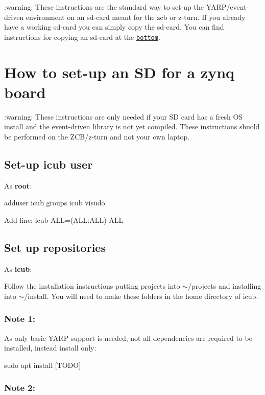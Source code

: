\+:warning\+: These instructions are the standard way to set-\/up the Y\+A\+R\+P/event-\/driven environment on an sd-\/card meant for the zcb or z-\/turn. If you already have a working sd-\/card you can simply copy the sd-\/card. You can find instructions for copying an sd-\/card at the \href{#how-copy-an-entire-sd-card-for-a-new-board}{\tt bottom}.

\section*{How to set-\/up an SD for a zynq board}

\+:warning\+: These instructions are only needed if your SD card has a fresh OS install and the {\ttfamily event-\/driven} library is not yet compiled. These instructions shuold be performed on the Z\+C\+B/z-\/turn and not your own laptop.

\subsection*{Set-\/up icub user}

As {\bfseries root}\+: 
\begin{DoxyCode}
adduser icub
groups icub
visudo
\end{DoxyCode}
 Add line\+: {\ttfamily icub A\+LL=(A\+LL\+:A\+LL) A\+LL}

\subsection*{Set up repositories}

As {\bfseries icub}\+:
\begin{DoxyItemize}
\item Follow the installation instructions putting projects into {\ttfamily $\sim$/projects} and installing into {\ttfamily $\sim$/install}. You will need to make these folders in the home directory of icub.
\end{DoxyItemize}

\subsubsection*{Note 1\+:}

As only basic {\ttfamily Y\+A\+RP} support is needed, not all dependencies are required to be installed, instead install only\+: 
\begin{DoxyCode}
sudo apt install [TODO]
\end{DoxyCode}
 \subsubsection*{Note 2\+:}

